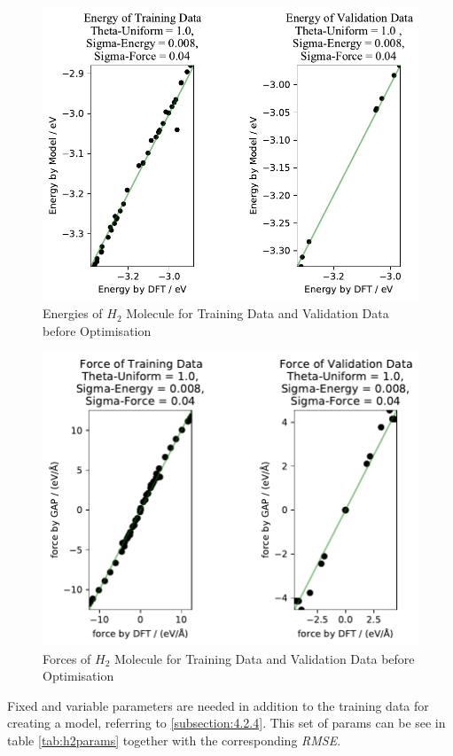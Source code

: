 \begin{figure}
	\includegraphics{../Bilder/Initial_Energies_H2.pdf}
	\caption{Energies of $H_2$ Molecule for Training Data and Validation Data before Optimisation}
	\label{epre_opt_h2}
\end{figure}

\begin{figure}
	\includegraphics{../Bilder/Initial_Forces_H2.pdf}
	\caption{Forces  of $H_2$ Molecule for Training Data and Validation Data before Optimisation}
	\label{fpre_opt_h2}
\end{figure}

Fixed and variable parameters are needed in addition to the training data for creating a model, referring to \ref{subsection:4.2.4}. This set of params can be see in table \ref{tab:h2params} together with the corresponding \textit{RMSE}. 




